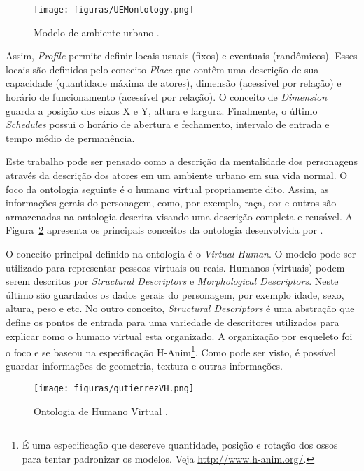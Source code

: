 \begin{figure}[t]
  \centering
    \texttt{[image: figuras/UEMontology.png]}
  \caption{Modelo de ambiente urbano \cite{paiva2005ontology}.}
  \label{fig:UEM}
\end{figure}

Assim, \emph{Profile} permite definir locais usuais (fixos) e eventuais
(randômicos). Esses locais são definidos pelo conceito \emph{Place} que contêm
uma descrição de sua capacidade (quantidade máxima de atores), dimensão
(acessível por relação) e horário de funcionamento (acessível por relação). O
conceito de \emph{Dimension} guarda a posição dos eixos X e Y, altura e
largura. Finalmente, o último \emph{Schedules} possui o horário de abertura e
fechamento, intervalo de entrada e tempo médio de permanência. %

Este trabalho pode ser pensado como a descrição da mentalidade dos personagens
através da descrição dos atores em um ambiente urbano em sua vida normal. O
foco da ontologia seguinte é o humano virtual propriamente dito. Assim, as
informações gerais do personagem, como, por exemplo, raça, cor e outros são
armazenadas na ontologia descrita visando uma descrição completa e reusável.
A Figura~\ref{fig:OVH} apresenta os principais conceitos da ontologia
desenvolvida por \citet{Gutierrez:2007:OVH:1229160.1229164}.

O conceito principal definido na ontologia é o \emph{Virtual Human}. O modelo
pode ser utilizado para representar pessoas virtuais ou reais. Humanos
(virtuais) podem serem descritos por \emph{Structural Descriptors} e
\emph{Morphological Descriptors}. Neste último são guardados os dados gerais
do personagem, por exemplo idade, sexo, altura, peso e etc. No outro conceito,
\emph{Structural Descriptors} é uma abstração que define os pontos de entrada
para uma variedade de descritores utilizados para explicar como o humano
virtual esta organizado. A organização por esqueleto foi o foco e se baseou na
especificação H-Anim\footnote{É uma especificação que descreve quantidade,
posição e rotação dos ossos para tentar padronizar os modelos.
Veja \url{http://www.h-anim.org/}.}. Como pode ser visto, é possível guardar
informações de geometria, textura e outras informações.

\begin{figure}[t]
  \centering
    \texttt{[image: figuras/gutierrezVH.png]}
  \caption{Ontologia de Humano Virtual \cite{Gutierrez:2007:OVH:1229160.1229164}.}
  \label{fig:OVH}
\end{figure}

